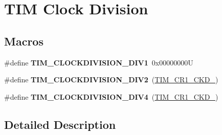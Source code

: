 \hypertarget{group___t_i_m___clock_division}{}\section{T\+IM Clock Division}
\label{group___t_i_m___clock_division}
\subsection*{Macros}
\begin{DoxyCompactItemize}
\item 
\mbox{\label{group___t_i_m___clock_division_ga309297ccd407a836ede6a42d4dc479c1}} 
\#define {\bfseries T\+I\+M\+\_\+\+C\+L\+O\+C\+K\+D\+I\+V\+I\+S\+I\+O\+N\+\_\+\+D\+I\+V1}~0x00000000U
\item 
\mbox{\label{group___t_i_m___clock_division_gaf84a16da8edb80a3d8af91fbfc046181}} 
\#define {\bfseries T\+I\+M\+\_\+\+C\+L\+O\+C\+K\+D\+I\+V\+I\+S\+I\+O\+N\+\_\+\+D\+I\+V2}~(\mbox{\hyperlink{group___peripheral___registers___bits___definition_ga458d536d82aa3db7d227b0f00b36808f}{T\+I\+M\+\_\+\+C\+R1\+\_\+\+C\+K\+D\+\_}})
\item 
\mbox{\label{group___t_i_m___clock_division_ga7cac7491610ffc135ea9ed54f769ddbc}} 
\#define {\bfseries T\+I\+M\+\_\+\+C\+L\+O\+C\+K\+D\+I\+V\+I\+S\+I\+O\+N\+\_\+\+D\+I\+V4}~(\mbox{\hyperlink{group___peripheral___registers___bits___definition_ga7ff2d6c2c350e8b719a8ad49c9a6bcbe}{T\+I\+M\+\_\+\+C\+R1\+\_\+\+C\+K\+D\+\_}})
\end{DoxyCompactItemize}


\subsection{Detailed Description}
